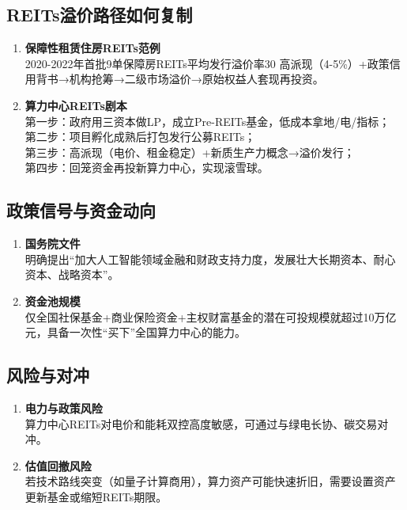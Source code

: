 \subsection{REITs溢价路径如何复制}
\begin{enumerate}[leftmargin=*, nosep]
    \item \textbf{保障性租赁住房REITs范例}  \\
    2020-2022年首批9单保障房REITs平均发行溢价率30%
    高派现（4-5\%）+政策信用背书→机构抢筹→二级市场溢价→原始权益人套现再投资。
    \item \textbf{算力中心REITs剧本}  \\
    第一步：政府用三资本做LP，成立Pre-REITs基金，低成本拿地/电/指标；  \\
    第二步：项目孵化成熟后打包发行公募REITs；  \\
    第三步：高派现（电价、租金稳定）+新质生产力概念→溢价发行；  \\
    第四步：回笼资金再投新算力中心，实现滚雪球。
\end{enumerate}

\subsection{政策信号与资金动向}
\begin{enumerate}[leftmargin=*, nosep]
    \item \textbf{国务院文件}  \\
    明确提出“加大人工智能领域金融和财政支持力度，发展壮大长期资本、耐心资本、战略资本”。
    \item \textbf{资金池规模}  \\
    仅全国社保基金+商业保险资金+主权财富基金的潜在可投规模就超过10万亿元，具备一次性“买下”全国算力中心的能力。
\end{enumerate}

\subsection{风险与对冲}
\begin{enumerate}[leftmargin=*, nosep]
    \item \textbf{电力与政策风险}  \\
    {\color{red}算力中心REITs对电价和能耗双控高度敏感，可通过与绿电长协、碳交易对冲。}
    \item \textbf{估值回撤风险}  \\
    若技术路线突变（如量子计算商用），算力资产可能快速折旧，需要设置资产更新基金或缩短REITs期限。
\end{enumerate}

